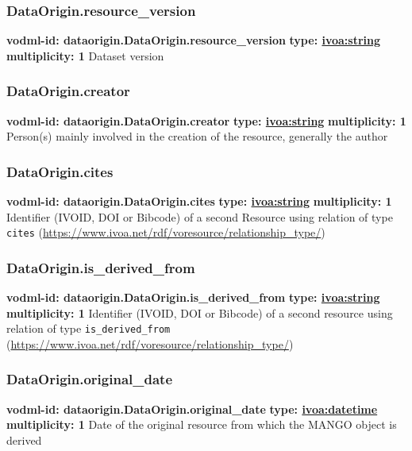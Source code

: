     \subsubsection{DataOrigin.resource\_version}
    \textbf{vodml-id: dataorigin.DataOrigin.resource\_version} \newline
    \textbf{type: \hyperref[sect:ivoa]{ivoa:string}} \newline
    \textbf{multiplicity: 1} \newline
    Dataset version

    \subsubsection{DataOrigin.creator}
    \textbf{vodml-id: dataorigin.DataOrigin.creator} \newline
    \textbf{type: \hyperref[sect:ivoa]{ivoa:string}} \newline
    \textbf{multiplicity: 1} \newline
    Person(s) mainly involved in the creation of the resource, generally the author

    \subsubsection{DataOrigin.cites}
    \textbf{vodml-id: dataorigin.DataOrigin.cites} \newline
    \textbf{type: \hyperref[sect:ivoa]{ivoa:string}} \newline
    \textbf{multiplicity: 1} \newline
    Identifier (IVOID, DOI or Bibcode) of a second Resource using relation of type \texttt{cites} (\url{https://www.ivoa.net/rdf/voresource/relationship\_type/})

    \subsubsection{DataOrigin.is\_derived\_from}
    \textbf{vodml-id: dataorigin.DataOrigin.is\_derived\_from} \newline
    \textbf{type: \hyperref[sect:ivoa]{ivoa:string}} \newline
    \textbf{multiplicity: 1} \newline
    Identifier (IVOID, DOI or Bibcode) of a second resource using relation of type \texttt{is\_derived\_from} (\url{https://www.ivoa.net/rdf/voresource/relationship\_type/})

    \subsubsection{DataOrigin.original\_date}
    \textbf{vodml-id: dataorigin.DataOrigin.original\_date} \newline
    \textbf{type: \hyperref[sect:ivoa]{ivoa:datetime}} \newline
    \textbf{multiplicity: 1} \newline
    Date of the original resource from which the MANGO object is derived

